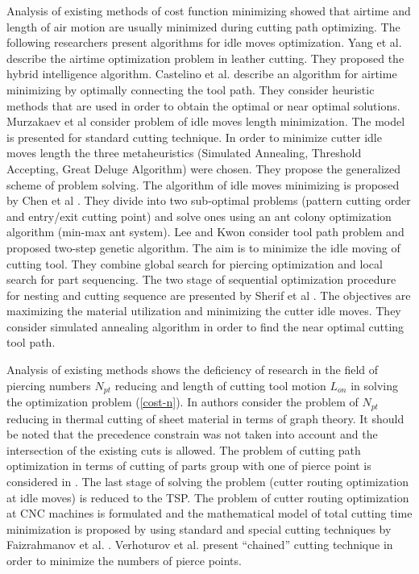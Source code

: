 \documentclass[runningheads]{llncs}
\begin{document}
Analysis  of existing methods of cost function minimizing showed that
airtime and length of air motion are usually minimized
during cutting path optimizing.
The following researchers present algorithms for idle moves optimization.
Yang et al. \cite{Yang2010}
describe the airtime optimization problem in leather cutting.
They proposed the hybrid intelligence algorithm.
Castelino et al. \cite{d2003tool}
describe an algorithm for airtime minimizing
by optimally connecting the tool path.
They consider heuristic methods
that are used in order to obtain the optimal or near optimal solutions.
Murzakaev et al \cite{ru17}
consider problem of idle moves length minimization.
The model is presented for standard cutting technique.
In order to minimize cutter idle moves length
the three metaheuristics
(Simulated Annealing, Threshold Accepting, Great Deluge Algorithm)
were chosen.
They propose the generalized scheme of problem solving.
The algorithm of idle moves minimizing is proposed by Chen et al \cite{Chen2014Dec}.
They divide into two sub-optimal problems
(pattern cutting order and entry/exit cutting point)
and solve ones using an ant colony optimization algorithm
(min-max ant system).
Lee and Kwon \cite{Lee2006Dec}
consider tool path problem and
proposed two-step genetic algorithm.
The aim is to minimize the idle moving of cutting tool.
They combine global search for piercing optimization
and local search for part sequencing.
The two stage of sequential optimization procedure for
nesting and cutting sequence are presented by Sherif et al \cite{Sherif2014Oct}.
The objectives are maximizing the material utilization
and minimizing the cutter idle moves.
They consider simulated annealing algorithm
in order to find the near optimal cutting tool path.

Analysis of existing methods shows
the deficiency of research in the field of piercing numbers $N_{pt}$
reducing
and length of cutting tool motion  $L_{on}$
in solving the optimization problem (\ref{cost-n}).
In \cite{Manber1984Jan}
authors consider the problem of $N_{pt}$ reducing
in thermal cutting of sheet material in terms of graph theory.
It should be noted that the precedence constrain was not taken into account
and the intersection of the existing cuts is allowed.
The problem of cutting path optimization in terms of cutting of parts group
with one of pierce point is considered in \cite{ru22}.
The last stage of solving the problem
(cutter routing optimization at idle moves)
is reduced to the TSP.
The problem of cutter routing optimization at CNC machines
is formulated and the mathematical model of total cutting time minimization
is proposed by using standard and special cutting techniques
by Faizrahmanov et al. \cite{ru23}.
Verhoturov et al. \cite{ru24}
present ``chained'' cutting technique in order to
minimize the numbers of pierce points.
\end{document}
